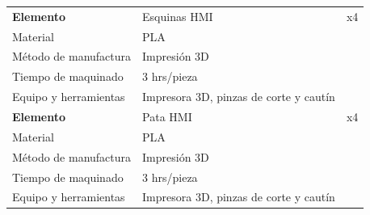 \begin{longtable}{@{} p{4.2cm} p{8.8cm} r @{}}
\textbf{Elemento}     & Esquinas HMI                                                       & x4 \\
Material              & PLA                                                                &    \\
Método de manufactura & Impresión 3D                                                       &    \\
Tiempo de maquinado   & 3 hrs/pieza                                                        &    \\
Equipo y herramientas & Impresora 3D, pinzas de corte y cautín                             &    \\
\midrule
\textbf{Elemento}     & Pata HMI                                                           & x4 \\
Material              & PLA                                                                &    \\
Método de manufactura & Impresión 3D                                                       &    \\
Tiempo de maquinado   & 3 hrs/pieza                                                        &    \\
Equipo y herramientas & Impresora 3D, pinzas de corte y cautín                             &    \\
\end{longtable}
